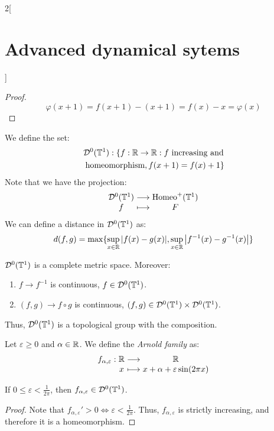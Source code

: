\documentclass[../../../main_math.tex]{subfiles}
\begin{document}
\begin{multicols}{2}[\section{Advanced dynamical sytems}]
\begin{proof}
    $$
      \varphi(x+1)=f(x+1)-(x+1)=f(x)-x=\varphi(x)
    $$
  \end{proof}
  \begin{definition}
    We define the set:
    \begin{multline*}
      \mathcal{D}^0(\mathbb{T}^1):\{f:\mathbb{R}\to\mathbb{R}:f\text{ increasing and}\\
      \text{ homeomorphism}, f(x+1)=f(x)+1\}
    \end{multline*}
    Note that we have the projection:
    $$
      \function{}{\mathcal{D}^0(\TT^1)}{\Homeoplus(\TT^1)}{f}{F}
    $$
    We can define a distance in $\mathcal{D}^0(\mathbb{T}^1)$ as:
    $$
      d(f,g)=\max\{ \sup_{x\in\mathbb{R}}\abs{f(x)-g(x)},\sup_{x\in\mathbb{R}}\abs{f^{-1}(x)-g^{-1}(x)}\}
    $$
  \end{definition}
  \begin{lemma}
    $\mathcal{D}^0(\mathbb{T}^1)$ is a complete metric space. Moreover:
    \begin{enumerate}
      \item $f\to f^{-1}$ is continuous, $f\in \mathcal{D}^0(\mathbb{T}^1)$.
      \item $(f,g)\to f\circ g$ is continuous, $(f,g)\in \mathcal{D}^0(\mathbb{T}^1)\times \mathcal{D}^0(\mathbb{T}^1)$.
    \end{enumerate}
    Thus, $\mathcal{D}^0(\mathbb{T}^1)$ is a topological group with the composition.
  \end{lemma}
  \begin{definition}
    Let $\varepsilon\geq 0$ and $\alpha\in\mathbb{R}$. We define the \emph{Arnold family} as:
    $$
      \function{f_{\alpha,\varepsilon}}{\RR}{\RR}{x}{x+\alpha+\varepsilon\sin(2\pi x)}
    $$
  \end{definition}
  \begin{lemma}
    If $0\leq \varepsilon<\frac{1}{2\pi}$, then $f_{\alpha,\varepsilon}\in \mathcal{D}^0(\mathbb{T}^1)$.
  \end{lemma}
  \begin{proof}
    Note that ${f_{\alpha,\varepsilon}}'>0\iff \varepsilon<\frac{1}{2\pi}$. Thus, $f_{\alpha,\varepsilon}$ is strictly increasing, and therefore it is a homeomorphism.
  \end{proof}

\end{multicols}
\end{document}
